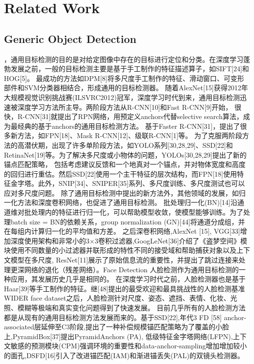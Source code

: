 \documentclass[twocolumn,10pt,a4paper]{article}%
\begin{document}
	\section{Related Work}
	\subsection{Generic Object Detection} ，通用目标检测的目的是对给定图像中存在的目标进行定位和分类。在深度学习蓬勃发展之前，一般的目标检测主要是基于手工制作的特征描述算子，如SIFT[24]和HOG[5]。
	最成功的方法如DPM[8]将多尺度手工制作的特征、滑动窗口、可变形部件和SVM分类器相结合，形成通用的目标检测器。
	随着AlexNet[15]获得2012年大规模视觉识别挑战赛(ILSVRC2012)冠军，深度学习时代到来，通用目标检测迅速被深度学习方法所主导。两阶段方法从R-CNN[10]和Fast R-CNN[9]开始，
	很快，R-CNN[31]就提出了RPN网络，用预定义anchors代替selective search算法，成为最经典的基于anchors的通用目标检测方法。
	基于Faster R-CNN[31]，提出了很多新方法，如FPN[18]、Mask R-CNN[12]、级联R-CNN[1]等。
	为了克服两阶段方法的高潜伏期，出现了许多单阶段方法，如YOLO系列[30,28,29]、SSD[22]和RetinaNet[19]等。为了解决多尺度或小物体的问题，YOLOs[30,28,29]提出了新的锚点匹配策略，
	包括考虑建议反馈和一个地真对一个锚点，并对物体宽度和高度的回归进行重估。然后SSD[22]使用一个主干特征的层次结构，而FPN[18]使用特征金字塔。此外，SNIP[34]、SNIPER[35]系列、多尺度训练、多尺度测试也可以应对多尺度问题。
	除了通用目标检测中提出的新方法外，其他领域的发展，如归一化方法和深度卷积网络，也促进了通用目标检测。
	批处理归一化(BN)[14]沿通道维对批处理内的特征进行归一化，可以帮助模型收敛，使模型能够训练。为了处理batch size = BN的依赖关系，group normalization (GN)[44]将通道分成组，并在每组内计算归一化的平均值和方差。
	之后深卷积网络,AlexNet [15], VGG[33]增加深度使用架构和非常小的3×3卷积过滤器,GoogLeNet[36]介绍了《盗梦空间》模块使用不同数量的小过滤器并联形成的特性不同的接受域和帮助捕获对象以及上下文模型在多尺度,
	ResNet[11]展示了原始信息流的重要性，并提出了跳过连接来处理更深网络的退化（残差网络）。Face Detection 人脸检测作为通用目标检测的一种应用，其发展历史几乎是相同的。
	在深度学习时代之前，人脸检测器也是基于Haar[39]等手工制作的特征。继[48]提出的最受欢迎和最具挑战性的人脸检测基准WIDER face dataset之后，人脸检测针对尺度、姿态、遮挡、表情、化妆、光照、模糊等极端和真实变化问题得到了快速发展。
	目前几乎所有的人脸检测方法都是从现有的通用目标检测方法发展而来的。基于SSD[22],年代3 FD [58] anchor-associated层延伸至C3阶段,提出了一种补偿规模锚匹配策略为了覆盖的小脸上,PyramidBox[37]提出PyramidAnchors (PA),
	低级特征金字塔网络(LFPN),上下文敏感的预测模块(CPM)强调环境的重要性和data-anchor-sampling增加增加较小的面孔,DSFD[16]引入了改进锚匹配(IAM)和渐进锚丢失(PAL)的双镜头检测器。
\end{document}
